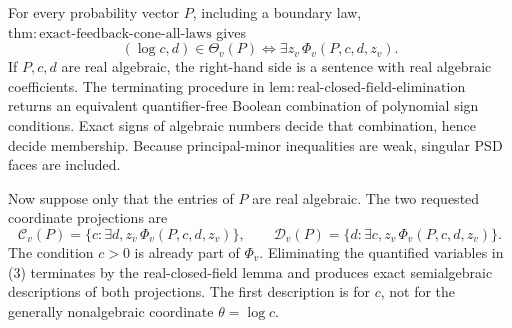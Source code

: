 For every probability vector \(P\), including a boundary law, \(\mathrm{thm{:}exact\text{-}feedback\text{-}cone\text{-}all\text{-}laws}\) gives
\[
 (\log c,d)\in\Theta_v(P)
 \Longleftrightarrow
 \exists z_v\,\Phi_v(P,c,d,z_v). \tag{2}
\]
If \(P,c,d\) are real algebraic, the right-hand side is a sentence with real algebraic coefficients.  The terminating procedure in \(\mathrm{lem{:}real\text{-}closed\text{-}field\text{-}elimination}\) returns an equivalent quantifier-free Boolean combination of polynomial sign conditions.  Exact signs of algebraic numbers decide that combination, hence decide membership.  Because principal-minor inequalities are weak, singular PSD faces are included.

Now suppose only that the entries of \(P\) are real algebraic.  The two requested coordinate projections are
\[
 \mathcal C_v(P)=\{c:\exists d,z_v\,\Phi_v(P,c,d,z_v)\},
 \qquad
 \mathcal D_v(P)=\{d:\exists c,z_v\,\Phi_v(P,c,d,z_v)\}. \tag{3}
\]
The condition \(c>0\) is already part of \(\Phi_v\).  Eliminating the quantified variables in (3) terminates by the real-closed-field lemma and produces exact semialgebraic descriptions of both projections.  The first description is for \(c\), not for the generally nonalgebraic coordinate \(\theta=\log c\).

